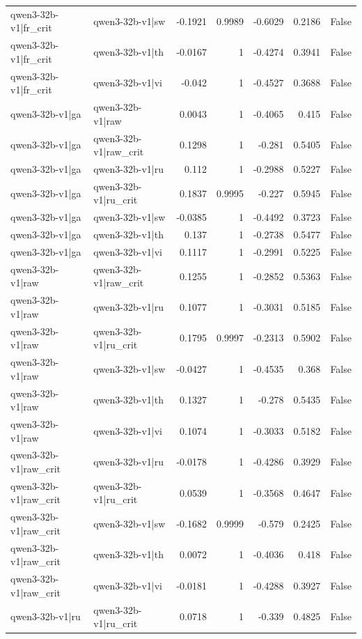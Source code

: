 \begin{table}
\begin{tabular}{l l r r r r l}
qwen3-32b-v1|fr_crit & qwen3-32b-v1|sw & -0.1921 & 0.9989 & -0.6029 & 0.2186 & False \\
qwen3-32b-v1|fr_crit & qwen3-32b-v1|th & -0.0167 & 1 & -0.4274 & 0.3941 & False \\
qwen3-32b-v1|fr_crit & qwen3-32b-v1|vi & -0.042 & 1 & -0.4527 & 0.3688 & False \\
qwen3-32b-v1|ga & qwen3-32b-v1|raw & 0.0043 & 1 & -0.4065 & 0.415 & False \\
qwen3-32b-v1|ga & qwen3-32b-v1|raw_crit & 0.1298 & 1 & -0.281 & 0.5405 & False \\
qwen3-32b-v1|ga & qwen3-32b-v1|ru & 0.112 & 1 & -0.2988 & 0.5227 & False \\
qwen3-32b-v1|ga & qwen3-32b-v1|ru_crit & 0.1837 & 0.9995 & -0.227 & 0.5945 & False \\
qwen3-32b-v1|ga & qwen3-32b-v1|sw & -0.0385 & 1 & -0.4492 & 0.3723 & False \\
qwen3-32b-v1|ga & qwen3-32b-v1|th & 0.137 & 1 & -0.2738 & 0.5477 & False \\
qwen3-32b-v1|ga & qwen3-32b-v1|vi & 0.1117 & 1 & -0.2991 & 0.5225 & False \\
qwen3-32b-v1|raw & qwen3-32b-v1|raw_crit & 0.1255 & 1 & -0.2852 & 0.5363 & False \\
qwen3-32b-v1|raw & qwen3-32b-v1|ru & 0.1077 & 1 & -0.3031 & 0.5185 & False \\
qwen3-32b-v1|raw & qwen3-32b-v1|ru_crit & 0.1795 & 0.9997 & -0.2313 & 0.5902 & False \\
qwen3-32b-v1|raw & qwen3-32b-v1|sw & -0.0427 & 1 & -0.4535 & 0.368 & False \\
qwen3-32b-v1|raw & qwen3-32b-v1|th & 0.1327 & 1 & -0.278 & 0.5435 & False \\
qwen3-32b-v1|raw & qwen3-32b-v1|vi & 0.1074 & 1 & -0.3033 & 0.5182 & False \\
qwen3-32b-v1|raw_crit & qwen3-32b-v1|ru & -0.0178 & 1 & -0.4286 & 0.3929 & False \\
qwen3-32b-v1|raw_crit & qwen3-32b-v1|ru_crit & 0.0539 & 1 & -0.3568 & 0.4647 & False \\
qwen3-32b-v1|raw_crit & qwen3-32b-v1|sw & -0.1682 & 0.9999 & -0.579 & 0.2425 & False \\
qwen3-32b-v1|raw_crit & qwen3-32b-v1|th & 0.0072 & 1 & -0.4036 & 0.418 & False \\
qwen3-32b-v1|raw_crit & qwen3-32b-v1|vi & -0.0181 & 1 & -0.4288 & 0.3927 & False \\
qwen3-32b-v1|ru & qwen3-32b-v1|ru_crit & 0.0718 & 1 & -0.339 & 0.4825 & False \\

\end{tabular}
\end{table}
